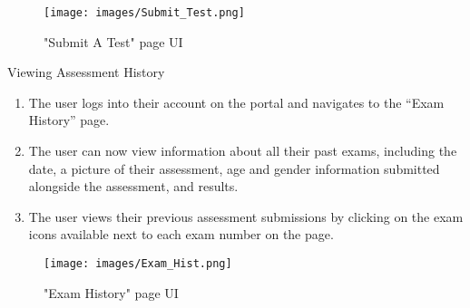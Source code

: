 \documentclass[pmlr,twocolumn,10pt]{jmlr} %
\begin{document}
\begin{figure}[h]
\label{fig:fig6}
\centering 
\texttt{[image: images/Submit\_Test.png]}
\caption{"Submit A Test" page UI}
\end{figure}

\vfill\eject

Viewing Assessment History

\begin{enumerate}
\item The user logs into their account on the portal and navigates to the “Exam History” page.
\item The user can now view information about all their past exams, including the date, a picture of their assessment, age and gender information submitted alongside the assessment, and results.
\item The user views their previous assessment submissions by clicking on the exam icons available next to each exam number on the page.
\end{enumerate}



\begin{figure} [h]
\label{fig: fig7}
\centering 
\texttt{[image: images/Exam\_Hist.png]}
\caption{"Exam History" page UI}
\end{figure}


\clearpage
\end{document}
